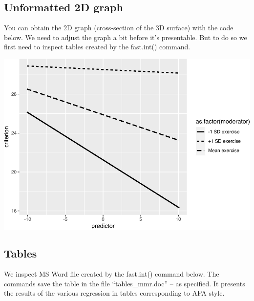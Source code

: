 \documentclass[
]{krantz}
\makeatletter
\newenvironment{Shaded}{\begin{snugshade}}{\end{snugshade}}
\newcommand{\FunctionTok}[1]{\textcolor[rgb]{0,0,0}{#1}}
\newcommand{\NormalTok}[1]{#1}
\newcommand{\OtherTok}[1]{\textcolor[rgb]{0.37,0.37,0.37}{#1}}
\newcommand{\SpecialCharTok}[1]{\textcolor[rgb]{0,0,0}{#1}}
\newenvironment{kframe}{%
\medskip{}
\setlength{\fboxsep}{.8em}
 \def\at@end@of@kframe{}%
 \ifinner\ifhmode%
  \def\at@end@of@kframe{\end{minipage}}%
  \begin{minipage}{\columnwidth}%
 \fi\fi%
 \def\FrameCommand##1{\hskip\@totalleftmargin \hskip-\fboxsep
 \colorbox{shadecolor}{##1}\hskip-\fboxsep
     \hskip-\linewidth \hskip-\@totalleftmargin \hskip\columnwidth}%
 \MakeFramed {\advance\hsize-\width
   \@totalleftmargin\z@ \linewidth\hsize
   \@setminipage}}%
 {\par\unskip\endMakeFramed%
 \at@end@of@kframe}
\renewenvironment{Shaded}{\begin{kframe}}{\end{kframe}}
\makeatother
\begin{document}
\hypertarget{unformatted-2d-graph}{%
\subsection{Unformatted 2D graph}\label{unformatted-2d-graph}}

You can obtain the 2D graph (cross-section of the 3D surface) with the code below. We need to adjust the graph a bit before it's presentable. But to do so we first need to inspect tables created by the fast.int() command.

\begin{Shaded}
\end{Shaded}

\includegraphics{bookdown_files/figure-latex/unnamed-chunk-506-1.pdf}

\hypertarget{tables}{%
\subsection{Tables}\label{tables}}

We inspect MS Word file created by the fast.int() command below. The commands save the table in the file ``tables\_mmr.doc'' -- as specified. It presents the results of the various regression in tables corresponding to APA style.
\end{document}

